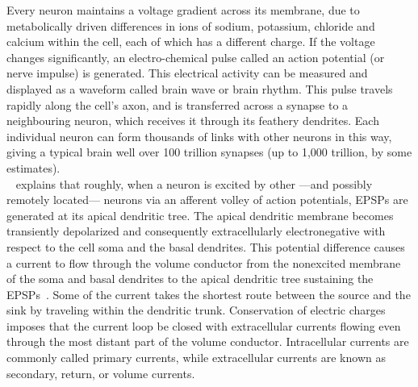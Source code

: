 Every neuron maintains a voltage gradient across its membrane, due to metabolically driven differences in ions of sodium, potassium, chloride and calcium within the cell, each of which has a different charge. If the voltage changes significantly, an electro-chemical pulse called an action potential (or nerve impulse) is generated. This electrical activity can be measured and displayed as a waveform called brain wave or brain rhythm. This pulse travels rapidly along the cell's axon, and is transferred across a synapse to a neighbouring neuron, which receives it through its feathery dendrites. Each individual neuron can form thousands of links with other neurons in this way, giving a typical brain well over 100 trillion synapses (up to 1,000 trillion, by some estimates).\\

~\cite{baillet2001electromagnetic} explains that roughly, when a neuron is excited by other —and possibly remotely located— neurons via an afferent volley of action potentials, \ac{EPSP}s are generated at its apical dendritic tree. The apical dendritic membrane becomes transiently depolarized and consequently extracellularly electronegative with respect to the cell soma and the basal dendrites. This potential difference causes a current to flow through the volume conductor from the nonexcited membrane of the soma and basal dendrites to the apical dendritic tree sustaining the EPSPs~\cite{gloor1985neuronal}.
Some of the current takes the shortest route between the source and the sink by traveling within the dendritic trunk. Conservation of electric charges imposes that the current loop be closed with extracellular currents flowing even through the most distant part of the volume conductor. Intracellular currents are commonly called primary currents, while extracellular currents are known as secondary, return, or volume currents.\\

